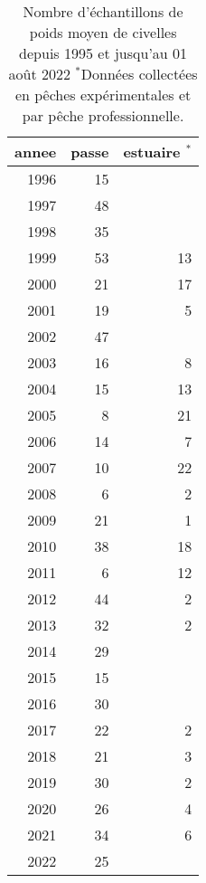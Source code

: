 \begin{table}[ht]
\centering
\begin{tabular}{rrr}
  \hline
annee & passe & estuaire $^*$ \\ 
  \hline
1996 & 15 &  \\ 
  1997 & 48 &  \\ 
  1998 & 35 &  \\ 
  1999 & 53 & 13 \\ 
  2000 & 21 & 17 \\ 
  2001 & 19 & 5 \\ 
  2002 & 47 &  \\ 
  2003 & 16 & 8 \\ 
  2004 & 15 & 13 \\ 
  2005 & 8 & 21 \\ 
  2006 & 14 & 7 \\ 
  2007 & 10 & 22 \\ 
  2008 & 6 & 2 \\ 
  2009 & 21 & 1 \\ 
  2010 & 38 & 18 \\ 
  2011 & 6 & 12 \\ 
  2012 & 44 & 2 \\ 
  2013 & 32 & 2 \\ 
  2014 & 29 &  \\ 
  2015 & 15 &  \\ 
  2016 & 30 &  \\ 
  2017 & 22 & 2 \\ 
  2018 & 21 & 3 \\ 
  2019 & 30 & 2 \\ 
  2020 & 26 & 4 \\ 
  2021 & 34 & 6 \\ 
  2022 & 25 &  \\ 
   \hline
\end{tabular}
\caption{Nombre d'échantillons de poids moyen de civelles depuis 1995 et jusqu'au 01 août 2022 $^*$Données collectées en pêches expérimentales et par pêche professionnelle.} 
\label{tnpm}
\end{table}
